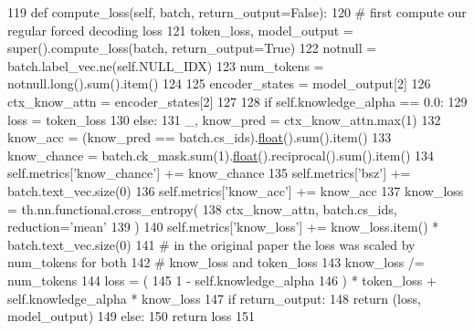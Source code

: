 \begin{DoxyCode}
119     \textcolor{keyword}{def }compute\_loss(self, batch, return\_output=False):
120         \textcolor{comment}{# first compute our regular forced decoding loss}
121         token\_loss, model\_output = super().compute\_loss(batch, return\_output=\textcolor{keyword}{True})
122         notnull = batch.label\_vec.ne(self.NULL\_IDX)
123         num\_tokens = notnull.long().sum().item()
124 
125         encoder\_states = model\_output[2]
126         ctx\_know\_attn = encoder\_states[2]
127 
128         \textcolor{keywordflow}{if} self.knowledge\_alpha == 0.0:
129             loss = token\_loss
130         \textcolor{keywordflow}{else}:
131             \_, know\_pred = ctx\_know\_attn.max(1)
132             know\_acc = (know\_pred == batch.cs\_ids).\hyperlink{namespaceprojects_1_1controllable__dialogue_1_1make__control__dataset_aa2b7207688c641dbc094ab44eca27113}{float}().sum().item()
133             know\_chance = batch.ck\_mask.sum(1).\hyperlink{namespaceprojects_1_1controllable__dialogue_1_1make__control__dataset_aa2b7207688c641dbc094ab44eca27113}{float}().reciprocal().sum().item()
134             self.metrics[\textcolor{stringliteral}{'know\_chance'}] += know\_chance
135             self.metrics[\textcolor{stringliteral}{'bsz'}] += batch.text\_vec.size(0)
136             self.metrics[\textcolor{stringliteral}{'know\_acc'}] += know\_acc
137             know\_loss = th.nn.functional.cross\_entropy(
138                 ctx\_know\_attn, batch.cs\_ids, reduction=\textcolor{stringliteral}{'mean'}
139             )
140             self.metrics[\textcolor{stringliteral}{'know\_loss'}] += know\_loss.item() * batch.text\_vec.size(0)
141             \textcolor{comment}{# in the original paper the loss was scaled by num\_tokens for both}
142             \textcolor{comment}{# know\_loss and token\_loss}
143             know\_loss /= num\_tokens
144             loss = (
145                 1 - self.knowledge\_alpha
146             ) * token\_loss + self.knowledge\_alpha * know\_loss
147         \textcolor{keywordflow}{if} return\_output:
148             \textcolor{keywordflow}{return} (loss, model\_output)
149         \textcolor{keywordflow}{else}:
150             \textcolor{keywordflow}{return} loss
151 
\end{DoxyCode}
\mbox{\label{classprojects_1_1wizard__of__wikipedia_1_1generator_1_1agents_1_1EndToEndAgent_ad5961a34fbea934bf2298c77ac220571}} 

